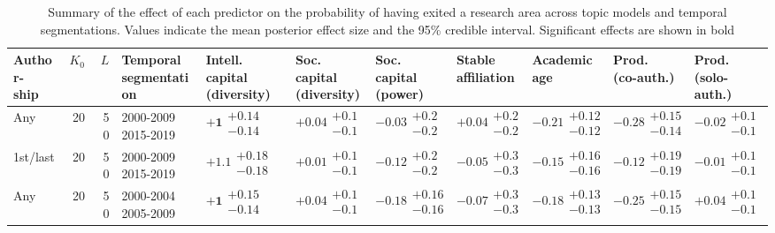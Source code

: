 \begin{table}[H]
\caption{Summary of the effect of each predictor on the probability of having exited a research area across topic models and temporal segmentations. Values indicate the mean posterior effect size and the 95\% credible interval. Significant effects are shown in bold}
\label{table:full_summary_exited}
\renewcommand{\arraystretch}{2}\fontsize{6}{7}\selectfont\begin{tabular}{lrrllllllll}
\toprule
\makecell{Author-\\ ship} & $K_0$ & $L$ & \makecell{Temporal \\ segmentation} & \makecell{Intell. capital \\ (diversity)} & \makecell{Soc. capital \\ (diversity)} & \makecell{Soc. capital \\ (power)} & \makecell{Stable \\ affiliation} & \makecell{Academic \\ age} & \makecell{Prod. \\ (co-auth.)} & \makecell{Prod. \\ (solo-auth.)} \\
\midrule
Any & 20 & 50 & \makecell{2000-2009 \\ 2015-2019} & $\bm{+1}\substack{+0.14 \\ -0.14}$ & $+0.04\substack{+0.1 \\ -0.1}$ & $-0.03\substack{+0.2 \\ -0.2}$ & $+0.04\substack{+0.2 \\ -0.2}$ & $\bm{-0.21}\substack{+0.12 \\ -0.12}$ & $\bm{-0.28}\substack{+0.15 \\ -0.14}$ & $-0.02\substack{+0.1 \\ -0.1}$ \\
1st/last & 20 & 50 & \makecell{2000-2009 \\ 2015-2019} & $\bm{+1.1}\substack{+0.18 \\ -0.18}$ & $+0.01\substack{+0.1 \\ -0.1}$ & $-0.12\substack{+0.2 \\ -0.2}$ & $-0.05\substack{+0.3 \\ -0.3}$ & $-0.15\substack{+0.16 \\ -0.16}$ & $-0.12\substack{+0.19 \\ -0.19}$ & $-0.01\substack{+0.1 \\ -0.1}$ \\
Any & 20 & 50 & \makecell{2000-2004 \\ 2005-2009} & $\bm{+1}\substack{+0.15 \\ -0.14}$ & $+0.04\substack{+0.1 \\ -0.1}$ & $\bm{-0.18}\substack{+0.16 \\ -0.16}$ & $-0.07\substack{+0.3 \\ -0.3}$ & $\bm{-0.18}\substack{+0.13 \\ -0.13}$ & $\bm{-0.25}\substack{+0.15 \\ -0.15}$ & $+0.04\substack{+0.1 \\ -0.1}$ \\

\end{tabular}
\end{table}
